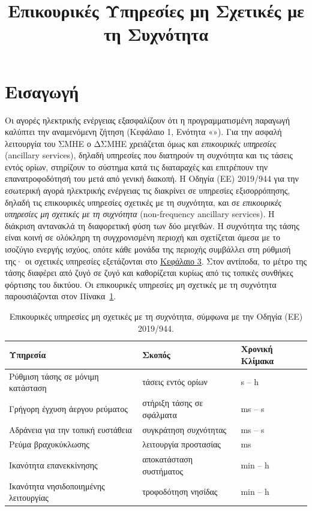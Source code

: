 \title{Επικουρικές Υπηρεσίες μη Σχετικές με τη Συχνότητα}

\section{Εισαγωγή}
\label{kef-02-theoria}
Οι αγορές ηλεκτρικής ενέργειας εξασφαλίζουν ότι η προγραμματισμένη παραγωγή καλύπτει την
αναμενόμενη ζήτηση (Κεφάλαιο 1, Ενότητα «»). Για την ασφαλή λειτουργία του
ΣΜΗΕ ο ΔΣΜΗΕ χρειάζεται όμως και \emph{επικουρικές υπηρεσίες} (ancillary services), δηλαδή
υπηρεσίες που διατηρούν τη συχνότητα και τις τάσεις εντός ορίων, στηρίζουν το σύστημα κατά τις
διαταραχές και επιτρέπουν την επανατροφοδότησή του μετά από γενική διακοπή. Η Οδηγία (ΕΕ)
2019/944 για την εσωτερική αγορά ηλεκτρικής ενέργειας τις διακρίνει σε υπηρεσίες εξισορρόπησης,
δηλαδή τις επικουρικές υπηρεσίες σχετικές με τη συχνότητα, και σε \emph{επικουρικές υπηρεσίες
μη σχετικές με τη συχνότητα} (non-frequency ancillary services). Η διάκριση αντανακλά τη
διαφορετική φύση των δύο μεγεθών. Η συχνότητα της τάσης είναι κοινή σε ολόκληρη τη
συγχρονισμένη περιοχή και σχετίζεται άμεσα με το ισοζύγιο ενεργής ισχύος, οπότε κάθε μονάδα της
περιοχής συμβάλλει στη ρύθμισή της· οι σχετικές υπηρεσίες εξετάζονται στο
\hyperref[kef-03-theoria]{Κεφάλαιο 3}. Στον αντίποδα, το μέτρο της τάσης διαφέρει από ζυγό σε
ζυγό και καθορίζεται κυρίως από τις τοπικές συνθήκες φόρτισης του δικτύου. Οι επικουρικές
υπηρεσίες μη σχετικές με τη συχνότητα παρουσιάζονται στον Πίνακα~\ref{tab:nfas}.

\begin{table}[!htbp]
\centering
\begin{tabular}{lll}
\hline
\textbf{Υπηρεσία} & \textbf{Σκοπός} & \textbf{Χρονική Κλίμακα} \\
\hline
Ρύθμιση τάσης σε μόνιμη κατάσταση & τάσεις εντός ορίων & s -- h \\
Γρήγορη έγχυση άεργου ρεύματος & στήριξη τάσης σε σφάλματα & ms -- s \\
Αδράνεια για την τοπική ευστάθεια & συγκράτηση συχνότητας & ms -- s \\
Ρεύμα βραχυκύκλωσης & λειτουργία προστασίας & ms \\
Ικανότητα επανεκκίνησης & αποκατάσταση συστήματος & min -- h \\
Ικανότητα νησιδοποιημένης λειτουργίας & τροφοδότηση νησίδας & min -- h \\
\hline
\end{tabular}
\caption{Επικουρικές υπηρεσίες μη σχετικές με τη συχνότητα, σύμφωνα με την Οδηγία (ΕΕ)
2019/944.}
\label{tab:nfas}
\end{table}

